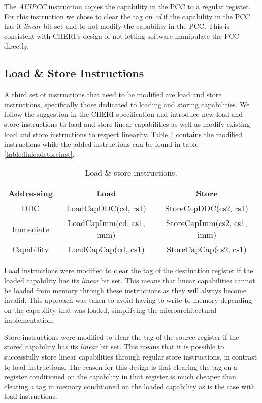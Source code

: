 The \textit{AUIPCC} instruction copies the capability in the PCC to a regular register. For this instruction we chose to clear the tag on \textit{cd} if the capability in the PCC has it \textit{linear} bit set and to not modify the capability in the PCC. This is consistent with CHERI's design of not letting software manipulate the PCC directly.

\subsection{Load \& Store Instructions}
A third set of instructions that need to be modified are load and store instructions, specifically those dedicated to loading and storing capabilities. We follow the suggestion in the CHERI specification and introduce new load and store instructions to load and store linear capabilities as well as modify existing load and store instructions to respect linearity. Table \ref{table:loadstoreinst} contains the modified instructions while the added instructions can be found in table \ref{table:linloadstoreinst}.

\begin{table}[h]
\centering
\begin{tabular}{| c | c | c |}
\hline
 Addressing & Load & Store \\
 \hline
 DDC & LoadCapDDC(cd, rs1) & StoreCapDDC(cs2, rs1) \\
 Immediate & LoadCapImm(cd, cs1, imm) & StoreCapImm(cs2, cs1, imm) \\
 Capability & LoadCapCap(cd, cs1) & StoreCapCap(cs2, cs1) \\
\hline
\end{tabular}
\caption{Load \& store instructions.}
\label{table:loadstoreinst}
\end{table}

Load instructions were modified to clear the tag of the destination register if the loaded capability has its \textit{linear} bit set. This means that linear capabilities cannot be loaded from memory through these instructions as they will always become invalid. This approach was taken to avoid having to write to memory depending on the capability that was loaded, simplifying the microarchitectural implementation.

Store instructions were modified to clear the tag of the source register if the stored capability has its \textit{linear} bit set. This means that it is possible to successfully store linear capabilities through regular store instructions, in contrast to load instructions. The reason for this design is that clearing the tag on a register conditioned on the capability in that register is much cheaper than clearing a tag in memory conditioned on the loaded capability as is the case with load instructions.


